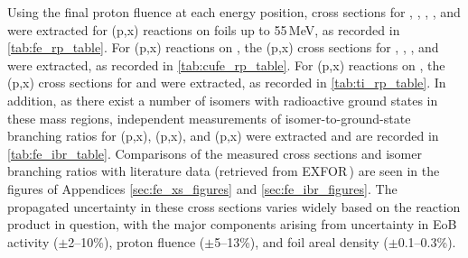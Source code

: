 Using the final proton fluence at each energy position, cross sections for , ,  ,   , and 
 were extracted for (p,x) reactions  on  foils up to 55\,MeV, as recorded in \autoref{tab:fe_rp_table}.
For  (p,x) reactions on , the (p,x) cross sections for  , , ,   and   were extracted, as recorded in \autoref{tab:cufe_rp_table}.
For  (p,x) reactions on , the (p,x) cross sections for   and   were extracted, as recorded in \autoref{tab:ti_rp_table}.
In addition, as there exist a number of isomers with radioactive ground states in these mass regions,  independent measurements of isomer-to-ground-state branching ratios for (p,x), (p,x), and (p,x) were  extracted and are recorded in \autoref{tab:fe_ibr_table}.
Comparisons  of the measured cross sections and isomer branching ratios with literature data (retrieved from EXFOR\,\cite{Otuka2014272}) are seen in the figures of Appendices \ref{sec:fe_xs_figures} and \ref{sec:fe_ibr_figures}.
The propagated uncertainty in these cross sections varies widely based on the reaction product in question, with the major components  arising from uncertainty in EoB activity ($\pm$2--10\%), proton fluence ($\pm$5--13\%), and foil areal density ($\pm$0.1--0.3\%).




